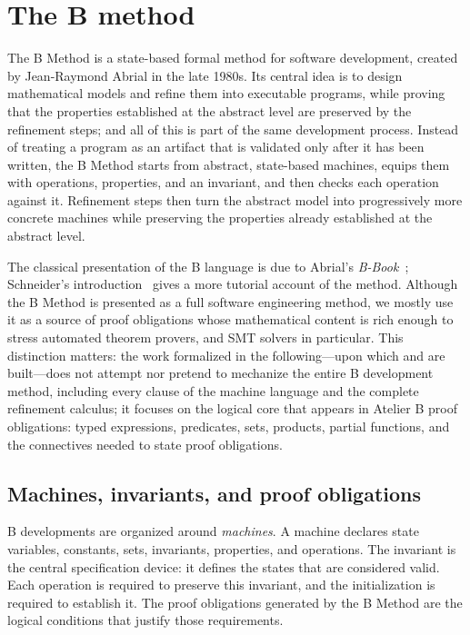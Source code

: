 \section{The B method}
\label{sec:b-method-atelier-b}
\label{sec:b-method}

The B Method is a state-based formal method for software development, created by Jean-Raymond Abrial in the late 1980s.
Its central idea is to design mathematical models and refine them into executable programs, while proving that the properties established at the abstract level are preserved by the refinement steps; and all of this is part of the same development process.
Instead of treating a program as an artifact that is validated only after it has been written, the B Method starts from abstract, state-based machines, equips them with operations, properties, and an invariant, and then checks each operation against it.
Refinement steps then turn the abstract model into progressively more concrete machines while preserving the properties already established at the abstract level.

The classical presentation of the B language is due to Abrial's \emph{B-Book}~\cite{abrial1996bbook}; Schneider's introduction~\cite{schneider2001bmethod} gives a more tutorial account of the method.
Although the B Method is presented as a full software engineering method, we mostly use it as a source of proof obligations whose mathematical content is rich enough to stress automated theorem provers, and SMT solvers in particular.
This distinction matters: the work formalized in the following---upon which \beer and \barrel are built---does not attempt nor pretend to mechanize the entire B development method, including every clause of the machine language and the complete refinement calculus;
it focuses on the logical core that appears in Atelier B proof obligations: typed expressions, predicates, sets, products, partial functions, and the connectives needed to state proof obligations.

\subsection{Machines, invariants, and proof obligations}

B developments are organized around \emph{machines}.
A machine declares state variables, constants, sets, invariants, properties, and operations.
The invariant is the central specification device: it defines the states that are considered valid.
Each operation is required to preserve this invariant, and the initialization is required to establish it.
The proof obligations generated by the B Method are the logical conditions that justify those requirements.

